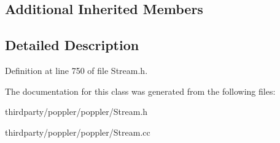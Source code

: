 \subsection*{Additional Inherited Members}


\subsection{Detailed Description}


Definition at line 750 of file Stream.\+h.



The documentation for this class was generated from the following files\+:\begin{DoxyCompactItemize}
\item 
thirdparty/poppler/poppler/Stream.\+h\item 
thirdparty/poppler/poppler/Stream.\+cc\end{DoxyCompactItemize}
